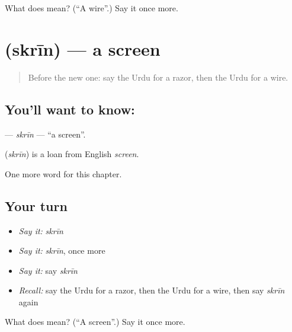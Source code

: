 \begin{tcolorbox}[breakable,colback=teal!4,colframe=teal!35!black,title={Before you move on}]
What does  mean? (\textquotedblleft{}A wire\textquotedblright{}.) Say it once more.
\end{tcolorbox}
\section[\texorpdfstring{\ur{سکرین} (skrīn)}{سکرین (skrīn)}]{ (skrīn) — a screen}

\label{lesson:UR-C198-skrin}



\begin{quote}
Before the new one: say the Urdu for a razor, then the Urdu for a wire.
\end{quote}

\subsection*{You'll want to know: }
\textbf{} — \emph{skrīn} — \textquotedblleft{}a screen\textquotedblright{}.

\begin{cousinweb}
\textbf{} (\emph{skrīn}) is a loan from English \emph{screen}.
\end{cousinweb}

\begin{grammarlens}[title={What you've built}]
One more word for this chapter.
\end{grammarlens}

\subsection*{Your turn}
\begin{itemize}
\raggedright
  \item \emph{Say it:} \emph{skrīn}
  \item \emph{Say it:} \emph{skrīn}, once more
  \item \emph{Say it:} say \emph{skrīn}
  \item \emph{Recall:} say the Urdu for a razor, then the Urdu for a wire, then say \emph{skrīn} again
\end{itemize}

\begin{tcolorbox}[breakable,colback=teal!4,colframe=teal!35!black,title={Before you move on}]
What does  mean? (\textquotedblleft{}A screen\textquotedblright{}.) Say it once more.
\end{tcolorbox}
